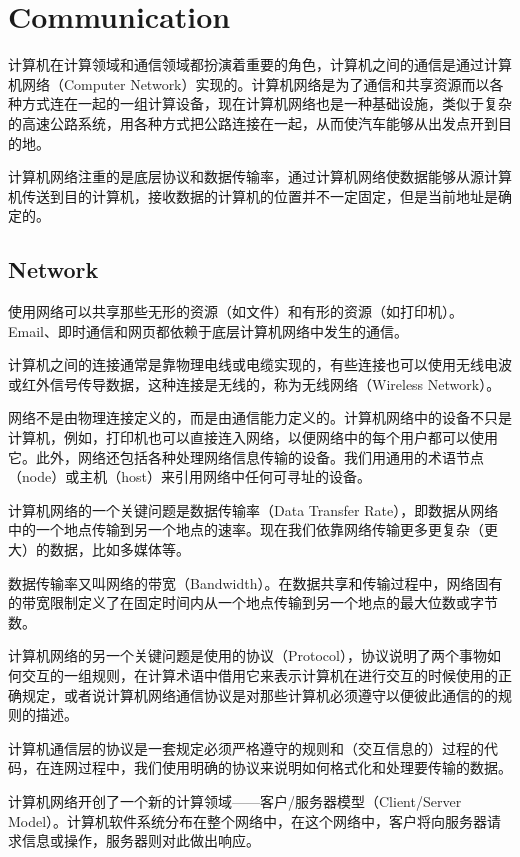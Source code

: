 \part{Communication}

计算机在计算领域和通信领域都扮演着重要的角色，计算机之间的通信是通过计算机网络（Computer Network）实现的。计算机网络是为了通信和共享资源而以各种方式连在一起的一组计算设备，现在计算机网络也是一种基础设施，类似于复杂的高速公路系统，用各种方式把公路连接在一起，从而使汽车能够从出发点开到目的地。

计算机网络注重的是底层协议和数据传输率，通过计算机网络使数据能够从源计算机传送到目的计算机，接收数据的计算机的位置并不一定固定，但是当前地址是确定的。


\chapter{Network}

使用网络可以共享那些无形的资源（如文件）和有形的资源（如打印机）。Email、即时通信和网页都依赖于底层计算机网络中发生的通信。

计算机之间的连接通常是靠物理电线或电缆实现的，有些连接也可以使用无线电波或红外信号传导数据，这种连接是无线的，称为无线网络（Wireless Network）。

网络不是由物理连接定义的，而是由通信能力定义的。计算机网络中的设备不只是计算机，例如，打印机也可以直接连入网络，以便网络中的每个用户都可以使用它。此外，网络还包括各种处理网络信息传输的设备。我们用通用的术语节点（node）或主机（host）来引用网络中任何可寻址的设备。

计算机网络的一个关键问题是数据传输率（Data Transfer Rate），即数据从网络中的一个地点传输到另一个地点的速率。现在我们依靠网络传输更多更复杂（更大）的数据，比如多媒体等。

数据传输率又叫网络的带宽（Bandwidth）。在数据共享和传输过程中，网络固有的带宽限制定义了在固定时间内从一个地点传输到另一个地点的最大位数或字节数。

计算机网络的另一个关键问题是使用的协议（Protocol），协议说明了两个事物如何交互的一组规则，在计算术语中借用它来表示计算机在进行交互的时候使用的正确规定，或者说计算机网络通信协议是对那些计算机必须遵守以便彼此通信的的规则的描述。

计算机通信层的协议是一套规定必须严格遵守的规则和（交互信息的）过程的代码，在连网过程中，我们使用明确的协议来说明如何格式化和处理要传输的数据。

计算机网络开创了一个新的计算领域——客户/服务器模型（Client/Server Model）。计算机软件系统分布在整个网络中，在这个网络中，客户将向服务器请求信息或操作，服务器则对此做出响应。

